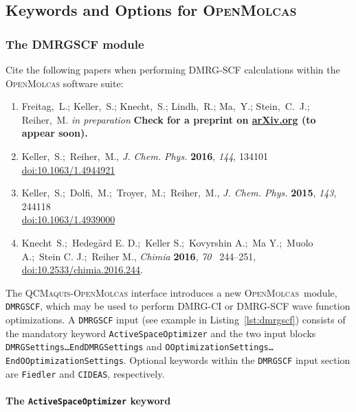 \documentclass[bibliography=totoc,12pt,a4paper]{scrartcl}
\newcommand{\mol}{\textsc{OpenMolcas}}
\newcommand{\qcm}{\textsc{QCMaquis}}
\newcommand{\hostp}{\mol}
\newcommand{\kwd}[1]{\texttt{#1}}
\begin{document}
\subsection{Keywords and Options for \hostp}
\label{sec:input}

\subsubsection{The DMRGSCF module}
\label{sec:dmrgscf}

\begin{framed}
  \noindent Cite the following papers when performing DMRG-SCF calculations within the \mol{} software suite:
  \begin{enumerate}
    \item Freitag,~L.; Keller,~S.; Knecht,~S.; Lindh,~R.; Ma,~Y.; Stein,~C.~J.;
    Reiher,~M. \textit{in preparation} \textbf{Check for a preprint on \href{http://arxiv.org/}{arXiv.org} (to appear soon).}
    \item{Keller,~S.;~Reiher,~M., \emph{J. Chem. Phys.} \textbf{2016}, \emph{144}, 134101\\   
      \href{https://doi.org/10.1063/1.4944921}{doi:10.1063/1.4944921}}
    \item Keller,~S.;~Dolfi,~M.;~Troyer,~M.;~Reiher,~M., \emph{J. Chem. Phys.}
      \textbf{2015}, \emph{143}, 244118\\ \href{https://doi.org/10.1063/1.4939000}{doi:10.1063/1.4939000}
	\item{Knecht~S.;~Hedeg{\aa}rd E. D.;~Keller S.;~Kovyrshin A.;~Ma  Y.;~Muolo A.;~Stein C. J.;~Reiher M.,
	  \emph{Chimia} \textbf{2016}, \emph{70} ~244--251,
	  \href{https://doi.org/10.2533/chimia.2016.244}{doi:10.2533/chimia.2016.244}.}
  \end{enumerate}
\end{framed}

The \qcm-\mol{} interface introduces a new \hostp\ module, \texttt{DMRGSCF}, which may be used to perform DMRG-CI or DMRG-SCF wave function optimizations.
A \texttt{DMRGSCF} input (see example in Listing~\ref{lst:dmrgscf}) consists of the mandatory keyword \kwd{ActiveSpaceOptimizer} and the two input blocks \kwd{DMRGSettings\ldots{}EndDMRGSettings} and \kwd{OOptimizationSettings\ldots{}EndOOptimizationSettings}.
Optional keywords within the \texttt{DMRGSCF} input section are \kwd{Fiedler} and \kwd{CIDEAS}, respectively.

\paragraph{The \kwd{ActiveSpaceOptimizer} keyword}\mbox{}\\
\end{document}
